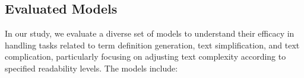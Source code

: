 \documentclass[11pt]{article}
\begin{document}




\subsection{Evaluated Models}
In our study, we evaluate a diverse set of models to understand their efficacy in handling tasks related to term definition generation, text simplification, and text complication, particularly focusing on adjusting text complexity according to specified readability levels. The models include:
\end{document}
